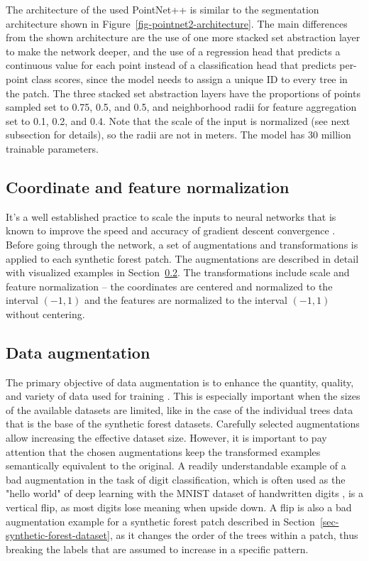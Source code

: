 The architecture of the used PointNet++ is similar to the segmentation architecture shown in Figure~\ref{fig-pointnet2-architecture}.
The main differences from the shown architecture are the use of one more stacked set abstraction layer to make the network deeper, and the use of a regression head that predicts a continuous value for each point instead of a classification head that predicts per-point class scores, since the model needs to assign a unique ID to every tree in the patch.
The three stacked set abstraction layers have the proportions of points sampled set to 0.75, 0.5, and 0.5, and neighborhood radii for feature aggregation set to 0.1, 0.2, and 0.4.
Note that the scale of the input is normalized (see next subsection for details), so the radii are not in meters.
The model has 30 million trainable parameters.

\subsection{Coordinate and feature normalization}

It's a well established practice to scale the inputs to neural networks that is known to improve the speed and accuracy of gradient descent convergence \citep{bishop2006pattern}.
Before going through the network, a set of augmentations and transformations is applied to each synthetic forest patch.
The augmentations are described in detail with visualized examples in Section~\ref{sec-augmentations}.
The transformations include scale and feature normalization – the coordinates are centered and normalized to the interval $(-1, 1)$ and the features are normalized to the interval $(-1, 1)$ without centering.

\subsection{Data augmentation}\label{sec-augmentations}

The primary objective of data augmentation is to enhance the quantity, quality, and variety of data used for training \citep{mumuniDataAugmentationComprehensive2022}.
This is especially important when the sizes of the available datasets are limited, like in the case of the individual trees data that is the base of the synthetic forest datasets.
Carefully selected augmentations allow increasing the effective dataset size.
However, it is important to pay attention that the chosen augmentations keep the transformed examples semantically equivalent to the original.
A readily understandable example of a bad augmentation in the task of digit classification, which is often used as the "hello world" of deep learning with the MNIST dataset of handwritten digits \citep{deng2012mnist}, is a vertical flip, as most digits lose meaning when upside down.
A flip is also a bad augmentation example for a synthetic forest patch described in Section~\ref{sec-synthetic-forest-dataset}, as it changes the order of the trees within a patch, thus breaking the labels that are assumed to increase in a specific pattern.

